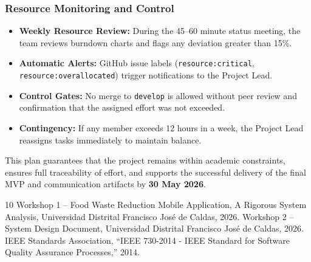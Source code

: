 \documentclass[9pt,conference]{IEEEtran}
\begin{document}
\subsubsection{Resource Monitoring and Control}

\begin{itemize}
    \item \textbf{Weekly Resource Review:} During the 45–60 minute status meeting, the team reviews burndown charts and flags any deviation greater than 15\%.
    \item \textbf{Automatic Alerts:} GitHub issue labels (\texttt{resource:critical}, \texttt{resource:overallocated}) trigger notifications to the Project Lead.
    \item \textbf{Control Gates:} No merge to \texttt{develop} is allowed without peer review and confirmation that the assigned effort was not exceeded.
    \item \textbf{Contingency:} If any member exceeds 12 hours in a week, the Project Lead reassigns tasks immediately to maintain balance.
\end{itemize}

This plan guarantees that the project remains within academic constraints, ensures full traceability of effort, and supports the successful delivery of the final MVP and communication artifacts by \textbf{30 May 2026}.



\begin{thebibliography}{10}
 Workshop 1 – Food Waste Reduction Mobile Application, A Rigorous System Analysis, Universidad Distrital Francisco José de Caldas, 2026.
 Workshop 2 – System Design Document, Universidad Distrital Francisco José de Caldas, 2026.
 IEEE Standards Association, ``IEEE 730-2014 - IEEE Standard for Software Quality Assurance Processes,'' 2014.
\end{thebibliography}
\end{document}
